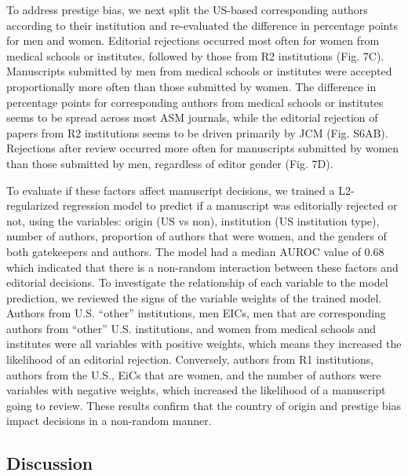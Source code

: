 \documentclass[11pt,]{article}
\begin{document}
To address prestige bias, we next split the US-based corresponding
authors according to their institution and re-evaluated the difference
in percentage points for men and women. Editorial rejections occurred
most often for women from medical schools or institutes, followed by
those from R2 institutions (Fig. 7C). Manuscripts submitted by men from
medical schools or institutes were accepted proportionally more often
than those submitted by women. The difference in percentage points for
corresponding authors from medical schools or institutes seems to be
spread across most ASM journals, while the editorial rejection of papers
from R2 institutions seems to be driven primarily by JCM (Fig. S6AB).
Rejections after review occurred more often for manuscripts submitted by
women than those submitted by men, regardless of editor gender (Fig.
7D).

To evaluate if these factors affect manuscript decisions, we trained a
L2-regularized regression model to predict if a manuscript was
editorially rejected or not, using the variables: origin (US vs non),
institution (US institution type), number of authors, proportion of
authors that were women, and the genders of both gatekeepers and
authors. The model had a median AUROC value of 0.68 which indicated that
there is a non-random interaction between these factors and editorial
decisions. To investigate the relationship of each variable to the model
prediction, we reviewed the signs of the variable weights of the trained
model. Authors from U.S. ``other'' institutions, men EICs, men that are
corresponding authors from ``other'' U.S. institutions, and women from
medical schools and institutes were all variables with positive weights,
which means they increased the likelihood of an editorial rejection.
Conversely, authors from R1 institutions, authors from the U.S., EiCs
that are women, and the number of authors were variables with negative
weights, which increased the likelihood of a manuscript going to review.
These results confirm that the country of origin and prestige bias
impact decisions in a non-random manner.

\subsection{Discussion}\label{discussion}
\end{document}
